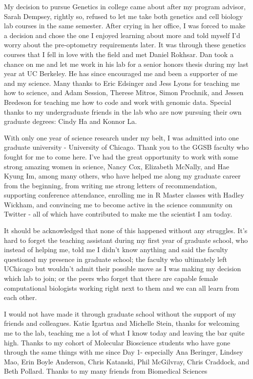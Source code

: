 \acknowledgments





My decision to pursue Genetics in college came about after my program advisor, Sarah Dempsey, rightly so, refused to let me take both genetics and cell biology lab courses in the same semester. After crying in her office, I was forced to make a decision and chose the one I enjoyed learning about more and told myself I'd worry about the pre-optometry requirements later. It was through these genetics courses that I fell in love with the field and met Daniel Rokhsar. Dan took a chance on me and let me work in his lab for a senior honors thesis during my last year at UC Berkeley. He has since encouraged me and been a supporter of me and my science. Many thanks to Eric Edsinger and Jess Lyons for teaching me how to science, and Adam Session, Therese Mitros, Simon Prochnik, and Jessen Bredeson for teaching me how to code and work with genomic data. Special thanks to my undergraduate friends in the lab who are now pursuing their own graduate degrees: Cindy Ha and Konnor La. 

With only one year of science research under my belt, I was admitted into one graduate university - University of Chicago. Thank you to the GGSB faculty who fought for me to come here. I've had the great opportunity to work with some strong amazing women in science, Nancy Cox, Elizabeth McNally, and Hae Kyung Im, among many others, who have helped me along my graduate career from the beginning, from writing me strong letters of recommendation, supporting conference attendance, enrolling me in R Master classes with Hadley Wickham, and convincing me to become active in the science community on Twitter - all of which have contributed to make me the scientist I am today.

It should be acknowledged that none of this happened without any struggles. It's hard to forget the teaching assistant during my first year of graduate school, who instead of helping me, told me I didn't know anything and said the faculty questioned my presence in graduate school; the faculty who ultimately left UChicago but wouldn't admit their possible move as I was making my decision which lab to join; or the peers who forget that there are capable female computational biologists working right next to them and we can all learn from each other.

I would not have made it through graduate school without the support of my friends and colleagues. Katie Igartua and Michelle Stein, thanks for welcoming me to the lab, teaching me a lot of what I know today and leaving the bar quite high. Thanks to my cohort of Molecular Bioscience students who have gone through the same things with me since Day 1- especially Ana Beringer, Lindsey Mao, Erin Boyle Anderson, Chris Katanski, Phil McGilvray, Chris Craddock, and Beth Pollard. Thanks to my many friends from Biomedical Sciences 

